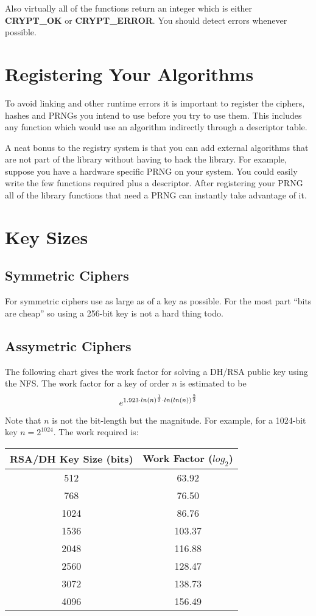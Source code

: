 \documentclass{book}
\begin{document}
Also virtually all of the functions return an integer which is either {\bf CRYPT\_OK} or {\bf CRYPT\_ERROR}.  You should
detect errors whenever possible.

\section{Registering Your Algorithms}
To avoid linking and other runtime errors it is important to register the ciphers, hashes and PRNGs you intend to use before you try to use them.  This includes any function which would use an algorithm indirectly through a descriptor table.  

A neat bonus to the registry system is that you can add external algorithms that are not part of the library without having to hack the library.  For example, suppose you have a hardware specific PRNG on your system.  You could easily write the few functions required plus a descriptor.  After registering your PRNG all of the library functions that need a PRNG can instantly take advantage of it.

\section{Key Sizes}

\subsection{Symmetric Ciphers}
For symmetric ciphers use as large as of a key as possible.  For the most part ``bits are cheap'' so using a 256-bit key
is not a hard thing todo.  

\subsection{Assymetric Ciphers}
The following chart gives the work factor for solving a DH/RSA public key using the NFS.  The work factor for a key of order
$n$ is estimated to be
\begin{equation}
e^{1.923 \cdot ln(n)^{1 \over 3} \cdot ln(ln(n))^{2 \over 3}} 
\end{equation}

Note that $n$ is not the bit-length but the magnitude.  For example, for a 1024-bit key $n = 2^{1024}$.  The work required 
is:
\begin{center}
\begin{tabular}{|c|c|}
    \hline RSA/DH Key Size (bits) & Work Factor ($log_2$) \\
    \hline 512 & 63.92 \\
    \hline 768 & 76.50 \\
    \hline 1024 & 86.76 \\
    \hline 1536 & 103.37 \\
    \hline 2048 & 116.88 \\
    \hline 2560 & 128.47 \\
    \hline 3072 & 138.73 \\
    \hline 4096 & 156.49 \\
    \hline 
\end{tabular}
\end{center}
\end{document}

